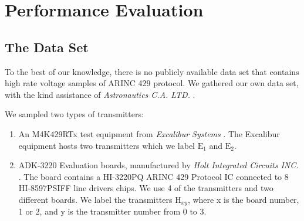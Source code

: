 \documentclass[compsoc,conference,a4paper]{IEEEtran}
\newcommand{\level}[1]{\section{#1}}
\newcommand{\sublevel}[1]{\subsection{#1}}
\newcommand{\level}[1]{\chapter{#1}}
\newcommand{\sublevel}[1]{\section{#1}}
\begin{document}
  \begin{table}
    \caption{Number of Features per Segment Type}
    \label{tab:feature_set_sizes}
    \centering
  \end{table}
  
\level{Performance Evaluation} \label{PerformanceEvaluation}

\sublevel{The Data Set} \label{TheDataSet}
  To the best of our knowledge, there is no publicly available data set that contains high rate voltage samples of ARINC 429 protocol. We gathered our own data set, with the kind assistance of \textit{Astronautics C.A. LTD.} \cite{astronautics2019home}.
  
  We sampled two types of transmitters:
  \begin{enumerate}
     \item An M4K429RTx test equipment from \textit{Excalibur Systems} \cite{excalibur2019m4k429rtx}. The Excalibur equipment hosts two transmitters which we label \(\text{E}_1\) and \(\text{E}_2\).
     \item ADK-3220 Evaluation boards, manufactured by \textit{Holt Integrated Circuits INC.} \cite{holt2019evaluation}. The board contains a HI-3220PQ ARINC 429 Protocol IC connected to 8 HI-8597PSIFF line drivers chips. We use 4 of the transmitters and two different boards. We label the transmitters \(\text{H}_{xy}\), where x is the board number, 1 or 2, and y is the transmitter number from 0 to 3.
  \end{enumerate}
  
\end{document}
